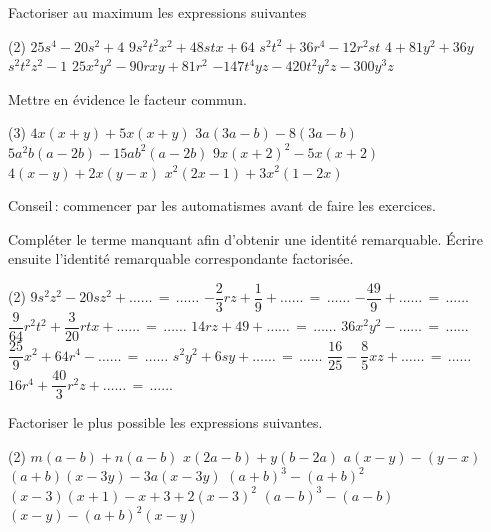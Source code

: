 \documentclass[a4paper,12pt]{report}
\begin{document}
\vspace*{-2\baselineskip}


\begin{acti}Factoriser au maximum les expressions suivantes

\begin{tasks}(2)
	\task $25 s^4-20 s^2 + 4 $
	\task $9 s^2 t^2 x^2 + 48 s t x + 64 $
 	\task $s^2 t^2 + 36 r^4-12 r^2 s t$
	\task $4  + 81 y^2 + 36 y$
	\task $s^2 t^2 z^2-1$
	\task $25 x^2 y^2-90 r x y + 81 r^2$
	\task $-147 t^4 y z - 420 t^2 y^2 z-300 y^3 z$
\end{tasks}
\end{acti}

\begin{acti}
Mettre en évidence le facteur commun.
\begin{tasks}(3)
\task $4x(x+y)+5 x(x+y)$
\task $3 a(3 a-b)-8(3 a-b)$
\task $5 a^2b(a-2 b)-15 a b^2(a-2 b)$
\task $9 x(x+2)^2-5 x(x+2)$
\task $4(x-y)+2 x(y-x)$
\task $x^2(2 x-1)+3 x^2(1-2 x)$
\end{tasks}
\end{acti}

Conseil\,: commencer par les automatismes avant de faire les exercices.
\begin{exo}Compléter le terme manquant afin d'obtenir une identité remarquable. Écrire ensuite l'identité remarquable correspondante factorisée.

\begin{tasks}(2)
	\task $9 s^2 z^2-20 s z^2 + \ldots\ldots\,=\,\ldots\ldots$
	\task $-\dfrac{2}{3} r z + \dfrac{1}{9}  + \ldots\ldots\,=\,\ldots\ldots$
	\task $-\dfrac{49}{9}  + \ldots\ldots\,=\,\ldots\ldots$
	\task $\dfrac{9}{64} r^2 t^2 + \dfrac{3}{20} r t x + \ldots\ldots\,=\,\ldots\ldots$
	\task $14 r z + 49  + \ldots\ldots\,=\,\ldots\ldots$
	\task $36 x^2 y^2-\ldots\ldots\,=\,\ldots\ldots$
	\task $\dfrac{25}{9} x^2 + 64 r^4-\ldots\ldots\,=\,\ldots\ldots$
	\task $s^2 y^2 + 6 s y + \ldots\ldots\,=\,\ldots\ldots$
	\task $\dfrac{16}{25} -\dfrac{8}{5} x z + \ldots\ldots\,=\,\ldots\ldots$
	\task $16 r^4 + \dfrac{40}{3} r^2 z + \ldots\ldots\,=\,\ldots\ldots$
\end{tasks}
\end{exo}

\begin{exo}
	Factoriser le plus possible les expressions suivantes.
	\begin{tasks}(2)
\task $m(a-b)+n(a-b)$
\task $x(2 a-b)+y(b-2 a)$
\task $a(x-y)-(y-x)$
\task $(a+b)(x-3 y)-3 a(x-3 y)$
\task $(a+b)^3-(a+b)^2$
\task $(x-3)(x+1)-x+3+2(x-3)^2$
\task $(a-b)^3-(a-b)$
\task $(x-y)-(a+b)^2(x-y)$
	\end{tasks}
\end{exo}
\end{document}
